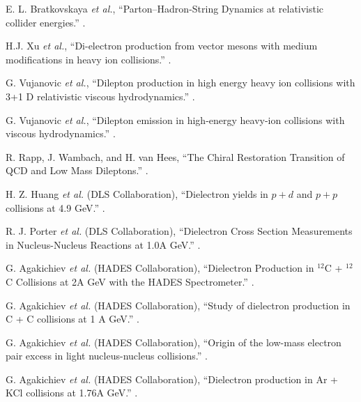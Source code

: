\begin{thebibliography}{10}
E. L. Bratkovskaya {\it et al.},
\newblock ``Parton–Hadron-String Dynamics at relativistic collider energies.''
.

H.J. Xu {\it et al.},
\newblock ``Di-electron production from vector mesons with medium modifications in heavy ion collisions.''
.

G. Vujanovic {\it et al.},
\newblock ``Dilepton production in high energy heavy ion collisions with 3+1 D relativistic viscous hydrodynamics.''
.

G. Vujanovic {\it et al.},
\newblock ``Dilepton emission in high-energy heavy-ion collisions with viscous hydrodynamics.''
.

R. Rapp, J. Wambach, and H. van Hees,
\newblock ``The Chiral Restoration Transition of QCD and Low Mass Dileptons.''
.

H. Z. Huang {\it et al.} (DLS Collaboration),
\newblock ``Dielectron yields in $p+d$ and $p+p$ collisions at 4.9 GeV.''
.

R. J. Porter {\it et al.} (DLS Collaboration),
\newblock ``Dielectron Cross Section Measurements in Nucleus-Nucleus Reactions at 1.0A GeV.''
.

G. Agakichiev {\it et al.} (HADES Collaboration),
\newblock ``Dielectron Production in $^{12}$C + $^{12}$C Collisions at 2A GeV with the HADES Spectrometer.''
.

G. Agakichiev {\it et al.} (HADES Collaboration),
\newblock ``Study of dielectron production in C + C collisions at 1 A GeV.''
.

G. Agakichiev {\it et al.} (HADES Collaboration),
\newblock ``Origin of the low-mass electron pair excess in light nucleus-nucleus collisions.''
.

G. Agakichiev {\it et al.} (HADES Collaboration),
\newblock ``Dielectron production in Ar + KCl collisions at 1.76A GeV.''
.


\end{thebibliography}
